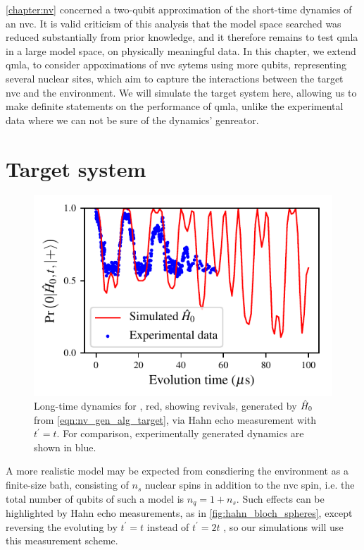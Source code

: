 \cref{chapter:nv} concerned a two-qubit approximation of the short-time dynamics of an \gls{nvc}. 
It is valid criticism of this analysis that the model space searched was reduced substantially from prior knowledge,
    and it therefore remains to test \gls{qmla} in a large model space, on physically meaningful data. 
In this chapter, we extend \gls{qmla}, to consider appoximations of \gls{nvc} sytems using more qubits, 
    representing several nuclear sites, which aim to capture the interactions between the 
    target \gls{nvc} and the environment. 
We will simulate the target system here, allowing us to make definite statements on the performance of \gls{qmla}, 
    unlike the experimental data where we can not be sure of the dynamics' genreator.

\par 

\section{Target system}
\begin{figure}
    \begin{center}
        \includegraphics{experimental_study/figures/nv_revival_raw_data.pdf}
    \end{center}
    \caption[Long-time dynamics for ]{
        Long-time dynamics for , red, showing revivals, 
            generated by $\hat{H}_0$ from \cref{eqn:nv_gen_alg_target}, via Hahn echo measurement with $t^{\prime} = t$.
        For comparison, experimentally generated dynamics are shown in blue. 
    }
    \label{fig:nv_revival_raw}
\end{figure}
A more realistic model may be expected from consdiering the environment as a finite-size bath, 
    consisting of $n_s$ nuclear spins in addition to the \gls{nvc} spin, 
    i.e. the total number of qubits of such a model is $n_q = 1 + n_s$.   
Such effects can be highlighted by Hahn echo measurements, 
    as in \cref{fig:hahn_bloch_spheres}, 
    except reversing the evoluting by $t^{\prime} = t$ instead of $t^{\prime} = 2t$
    \cite{childress2006coherent, breuer2002theory}, so our simulations will use this measurement scheme. 
\par 

